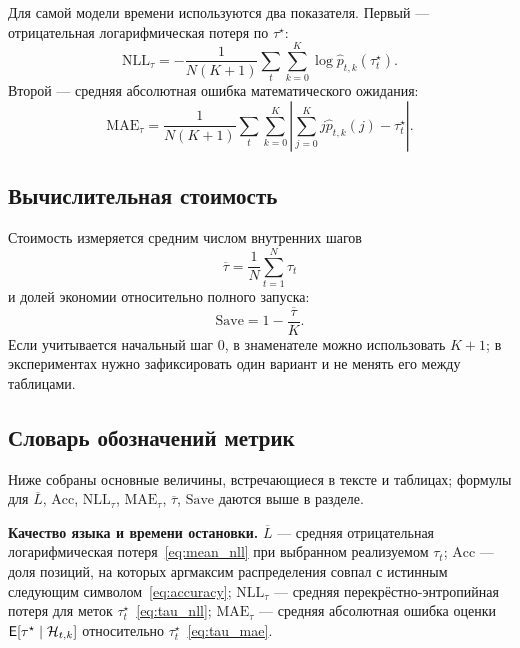 Для самой модели времени используются два показателя. Первый --- отрицательная логарифмическая
потеря по \(\tau^\star\):
\begin{equation}
  \mathrm{NLL}_{\tau}=-\frac{1}{N(K+1)}\sum_t\sum_{k=0}^{K}\log\widehat p_{t,k}(\tau_t^\star).
  \label{eq:tau_nll}
\end{equation}
Второй --- средняя абсолютная ошибка математического ожидания:
\begin{equation}
  \mathrm{MAE}_{\tau}=\frac{1}{N(K+1)}\sum_t\sum_{k=0}^{K}
  \left|\sum_{j=0}^{K}j\widehat p_{t,k}(j)-\tau_t^\star\right|.
  \label{eq:tau_mae}
\end{equation}

\subsection{Вычислительная стоимость}

Стоимость измеряется средним числом внутренних шагов
\begin{equation}
  \overline\tau=\frac{1}{N}\sum_{t=1}^{N}\tau_t
  \label{eq:mean_tau}
\end{equation}
и долей экономии относительно полного запуска:
\begin{equation}
  \mathrm{Save}=1-\frac{\overline\tau}{K}.
  \label{eq:saving}
\end{equation}
Если учитывается начальный шаг \(0\), в знаменателе можно использовать \(K+1\); в экспериментах
нужно зафиксировать один вариант и не менять его между таблицами.

\subsection{Словарь обозначений метрик}\label{sec:metrics_legend}

Ниже собраны основные величины, встречающиеся в тексте и таблицах; формулы для \(\overline L\),
\(\mathrm{Acc}\), \(\mathrm{NLL}_\tau\), \(\mathrm{MAE}_\tau\), \(\overline\tau\), \(\mathrm{Save}\)
даются выше в разделе.

\textbf{Качество языка и времени остановки.}
\(\overline L\) --- средняя отрицательная логарифмическая потеря~\eqref{eq:mean_nll} при
выбранном реализуемом \(\tau_t\); \(\mathrm{Acc}\) --- доля позиций, на которых аргмаксим
распределения совпал с истинным следующим символом~\eqref{eq:accuracy}; \(\mathrm{NLL}_\tau\) ---
средняя перекрёстно-энтропийная потеря для меток \(\tau_t^\star\)~\eqref{eq:tau_nll};
\(\mathrm{MAE}_\tau\) --- средняя абсолютная ошибка оценки \(\operatorname{\mathsf{E}}[\tau^\star\mid\mathcal{H}_{t,k}]\)
относительно \(\tau_t^\star\)~\eqref{eq:tau_mae}.

